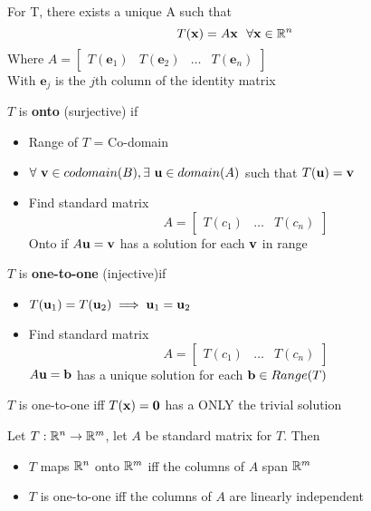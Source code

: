 \documentclass{report}
\begin{document}
\begin{theorem}
\end{theorem}
For T, there exists a unique A such that
\[
T(\mathbf{x}) = A \mathbf{x}\ \ \forall \mathbf{x} \in \mathbb{R}^n\\
\]
Where $A = \begin{bmatrix} T(\mathbf{e}_1) & T(\mathbf{e}_2) & \dots & T(\mathbf{e}_n) \end{bmatrix}$\\
With $\mathbf{e}_j$ is the $j$th column of the identity matrix


\begin{definition}
\end{definition}
$T$ is \textbf{onto} (surjective) if
\begin{itemize}
    \item Range of $T$ = Co-domain
    \item $\forall \ \vv \in codomain (B), \exists \ 
    \uu \in domain (A)$ such that $T(\mathbf{u})=\mathbf{v}$
    \item Find standard matrix 
    \[
    A = \begin{bmatrix}
        T(c_1) & \ldots & T(c_n)
    \end{bmatrix}
    \]
    Onto if $A \mathbf{u} = \mathbf{v}$ has a solution for each $\mathbf{v}$ in range
\end{itemize}

\begin{definition}
\end{definition}
$T$ is \textbf{one-to-one} (injective)if
\begin{itemize}
    \item $T(\mathbf{u}_1) = T(\mathbf{u}_2) \implies \mathbf{u}_1 = \mathbf{u}_2$
    \item Find standard matrix 
    \[
    A = \begin{bmatrix}
        T(c_1) & \ldots & T(c_n)
    \end{bmatrix}
    \]
    $A \mathbf{u} = \mathbf{b}$ has a unique solution for each $\mathbf{b} \in Range(T)$
\end{itemize}

\begin{theorem}
    $T$ is one-to-one iff $T(\mathbf{x}) = \mathbf{0}$ has a ONLY the trivial solution
\end{theorem}

\begin{theorem}
    Let $T: \mathbb{R}^n \to \mathbb{R}^m$, let $A$ be standard matrix for $T$. Then 
    \begin{itemize}
        \item $T$ maps $\mathbb{R}^n$ onto $\mathbb{R}^m$ iff the columns of $A$ span $\mathbb{R}^m$
        \item $T$ is one-to-one iff the columns of $A$ are linearly independent
    \end{itemize}
\end{theorem}
\end{document}
